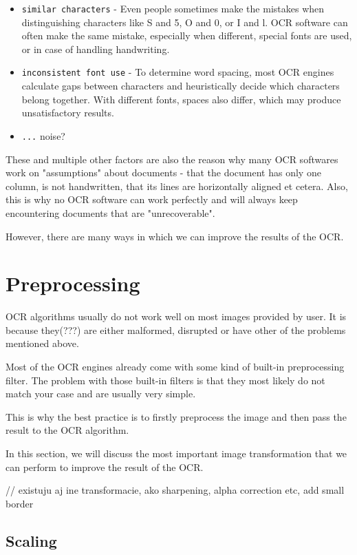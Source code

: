 \begin{itemize}
\item\texttt {similar characters} - Even people sometimes make the mistakes when distinguishing characters like S and 5, O and 0, or I and l. OCR software can often make the same mistake, especially when different, special fonts are used, or in case of handling handwriting.
\item\texttt {inconsistent font use} - To determine word spacing, most OCR engines calculate gaps between characters and heuristically decide which characters belong together. With different fonts, spaces also differ, which may produce unsatisfactory results.
\item\texttt {...} noise?
\end{itemize}

These and multiple other factors are also the reason why many OCR softwares work on "assumptions" about documents - that the document has only one column, is not handwritten, that its lines are horizontally aligned et cetera. Also, this is why no OCR software can work perfectly and will always keep encountering documents that are "unrecoverable". 

However, there are many ways in which we can improve the results of the OCR.

\section{Preprocessing}

OCR algorithms usually do not work well on most images provided by user. It is because they(???) are either malformed, disrupted or have other of the problems mentioned above.

Most of the OCR engines already come with some kind of built-in preprocessing filter. The problem with those built-in filters is that they most likely do not match your case and are usually very simple.

This is why the best practice is to firstly preprocess the image and then pass the result to the OCR algorithm.

In this section, we will discuss the most important image transformation that we can perform to improve the result of the OCR. 

// existuju aj ine transformacie, ako sharpening, alpha correction etc, add small border


\subsection{Scaling}

